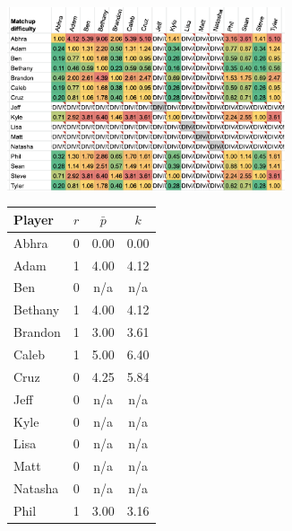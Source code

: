 \documentclass[letterpaper, 10 pt, conference]{ieeeconf}  %
\begin{document}
\begin{figure}[hb]
        \centering
        \begin{subfigure}[h]{0.5\textwidth}
                \centering
                \includegraphics[width=0.9\textwidth]{fig/difficulty_3.png}
                \caption{}
        \end{subfigure}
        \begin{subfigure}[h]{0.4\textwidth}
                \footnotesize
                \centering
                \begin{tabular}{lccc}
                        \toprule
                        Player  & $r$   & $\bar{p}$ & $k$ \\
                        \midrule
                        Abhra	& 0	& 0.00	& 0.00 \\
                        Adam	& 1	& 4.00	& 4.12 \\
                        Ben	& 0	& n/a	& n/a  \\
                        Bethany	& 1	& 4.00	& 4.12 \\
                        Brandon	& 1	& 3.00	& 3.61 \\
                        Caleb	& 1	& 5.00	& 6.40 \\
                        Cruz	& 0	& 4.25	& 5.84 \\
                        Jeff	& 0	& n/a	& n/a  \\
                        Kyle	& 0	& n/a	& n/a  \\
                        Lisa	& 0	& n/a	& n/a  \\
                        Matt	& 0	& n/a	& n/a  \\
                        Natasha	& 0	& n/a	& n/a  \\
                        Phil	& 1	& 3.00	& 3.16 \\

\end{tabular}
\end{subfigure}
\end{figure}
\end{document}
